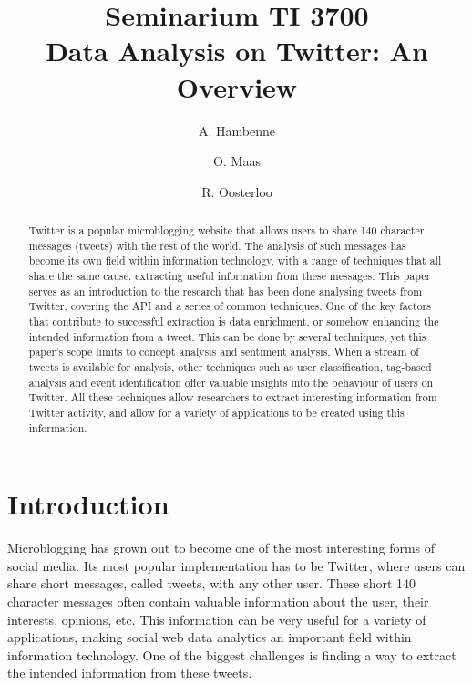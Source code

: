 \documentclass{article}
\title{Seminarium TI 3700\\ Data Analysis on Twitter: An Overview}
\author{A. Hambenne  \and
    O. Maas \and
    R. Oosterloo}
\date{}
\begin{document}
\maketitle
\thispagestyle{empty}

\begin{abstract}


Twitter is a popular microblogging website that allows users to share 140 character messages (tweets) with the rest of the world.
The analysis of such messages has become its own field within information technology, with a range of techniques that all share the same cause:
extracting useful information from these messages. This paper serves as an introduction to the research that has been done analysing tweets from Twitter,
covering the API and a series of common techniques. One of the key factors that contribute to successful extraction is data enrichment, or somehow enhancing
the intended information from a tweet. This can be done by several techniques, yet this paper's scope limits to concept analysis and sentiment analysis.
When a stream of tweets is available for analysis, other techniques such as user classification, tag-based analysis and event identification offer valuable
insights into the behaviour of users on Twitter. All these techniques allow researchers to extract interesting information from Twitter activity, and allow
for a variety of applications to be created using this information.
\end{abstract}


\section{Introduction}


Microblogging has grown out to become one of the most interesting forms of social media. Its most popular implementation has to be Twitter, 
where users can share short messages, called tweets, with any other user. These short 140 character messages often contain valuable information about the user, their
interests, opinions, etc. This information can be very useful for a variety of applications, making social web data analytics an important field within
information technology. One of the biggest challenges is finding a way to extract the intended information from these tweets. 
\end{document}
